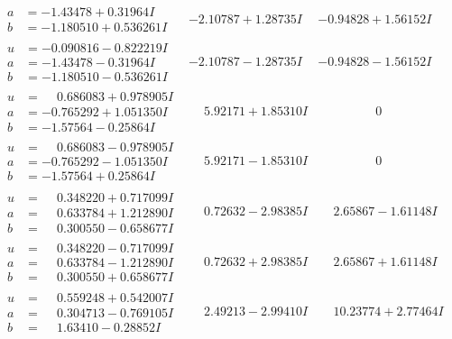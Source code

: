 \documentclass[1p]{elsarticle_modified}
\theoremstyle{definition}
\begin{document}
$$\begin{array}{c|c|c}
\begin{aligned}
a &= -1.43478 + 0.31964 I \\
b &= -1.180510 + 0.536261 I\end{aligned}
 & -2.10787 + 1.28735 I & -0.94828 + 1.56152 I \\ \hline\begin{aligned}
u &= -0.090816 - 0.822219 I \\
a &= -1.43478 - 0.31964 I \\
b &= -1.180510 - 0.536261 I\end{aligned}
 & -2.10787 - 1.28735 I & -0.94828 - 1.56152 I \\ \hline\begin{aligned}
u &= \phantom{-}0.686083 + 0.978905 I \\
a &= -0.765292 + 1.051350 I \\
b &= -1.57564 - 0.25864 I\end{aligned}
 & \phantom{-}5.92171 + 1.85310 I & \phantom{-0.000000 } 0 \\ \hline\begin{aligned}
u &= \phantom{-}0.686083 - 0.978905 I \\
a &= -0.765292 - 1.051350 I \\
b &= -1.57564 + 0.25864 I\end{aligned}
 & \phantom{-}5.92171 - 1.85310 I & \phantom{-0.000000 } 0 \\ \hline\begin{aligned}
u &= \phantom{-}0.348220 + 0.717099 I \\
a &= \phantom{-}0.633784 + 1.212890 I \\
b &= \phantom{-}0.300550 - 0.658677 I\end{aligned}
 & \phantom{-}0.72632 - 2.98385 I & \phantom{-}2.65867 - 1.61148 I \\ \hline\begin{aligned}
u &= \phantom{-}0.348220 - 0.717099 I \\
a &= \phantom{-}0.633784 - 1.212890 I \\
b &= \phantom{-}0.300550 + 0.658677 I\end{aligned}
 & \phantom{-}0.72632 + 2.98385 I & \phantom{-}2.65867 + 1.61148 I \\ \hline\begin{aligned}
u &= \phantom{-}0.559248 + 0.542007 I \\
a &= \phantom{-}0.304713 - 0.769105 I \\
b &= \phantom{-}1.63410 - 0.28852 I\end{aligned}
 & \phantom{-}2.49213 - 2.99410 I & \phantom{-}10.23774 + 2.77464 I \\ \hline\begin{aligned}

\end{aligned}
\end{array}$$
\end{document}
